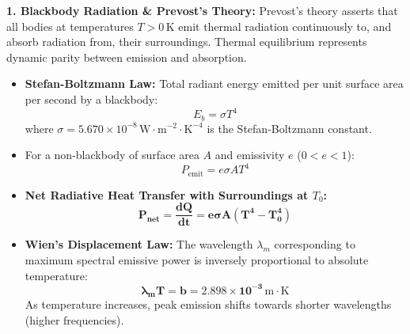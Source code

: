 \documentclass[10pt,twoside,openright]{book}
\begin{document}
\begin{conceptbox}
\textbf{1. Blackbody Radiation \& Prevost's Theory:}
Prevost's theory asserts that all bodies at temperatures $T > 0\,\mathrm{K}$ emit thermal radiation continuously to, and absorb radiation from, their surroundings. Thermal equilibrium represents dynamic parity between emission and absorption.
\begin{itemize}
  \item \textbf{Stefan-Boltzmann Law:} Total radiant energy emitted per unit surface area per second by a blackbody:
  \begin{equation}
    E_b = \sigma T^4
  \end{equation}
  where $\sigma = 5.670 \times 10^{-8}\,\mathrm{W}\cdot\mathrm{m}^{-2}\cdot\mathrm{K}^{-4}$ is the Stefan-Boltzmann constant.
  \item For a non-blackbody of surface area $A$ and emissivity $e$ ($0 < e < 1$):
  \begin{equation}
    P_{\text{emit}} = e \sigma A T^4
  \end{equation}
  \item \textbf{Net Radiative Heat Transfer with Surroundings at $T_0$:}
  \begin{equation}
    \mathbf{P_{\text{net}} = \frac{dQ}{dt} = e \sigma A (T^4 - T_0^4)}
  \end{equation}
  \item \textbf{Wien's Displacement Law:} The wavelength $\lambda_m$ corresponding to maximum spectral emissive power is inversely proportional to absolute temperature:
  \begin{equation}
    \mathbf{\lambda_m T = b = 2.898 \times 10^{-3}\,\mathrm{m}\cdot\mathrm{K}}
  \end{equation}
  As temperature increases, peak emission shifts towards shorter wavelengths (higher frequencies).
\end{itemize}
\end{conceptbox}
\end{document}
